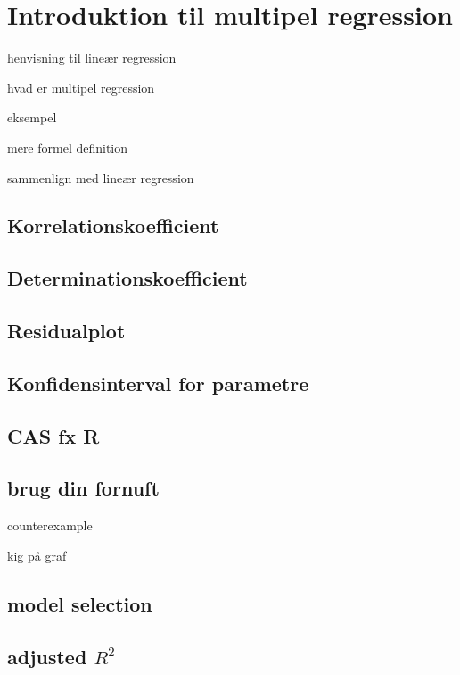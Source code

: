 \documentclass[11pt,twoside,a4paper]{article}
\begin{document}
\section{Introduktion til multipel regression}

henvisning til lineær regression

hvad er multipel regression

eksempel

mere formel definition

sammenlign med lineær regression

\subsection{Korrelationskoefficient}

\subsection{Determinationskoefficient}

\subsection{Residualplot}


\subsection{Konfidensinterval for parametre}


\subsection{CAS fx R}

\subsection{brug din fornuft}
counterexample

kig på graf

\subsection{model selection}

\subsection{adjusted \(R^2\)}
\end{document}
